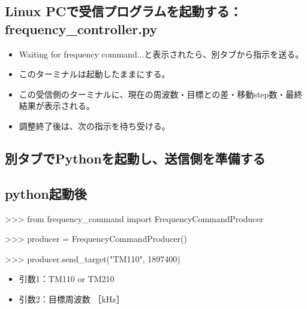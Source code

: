\documentclass[a4paper,11pt]{ltjsarticle}
\begin{document}
\subsection{Linux PCで受信プログラムを起動する：frequency\_controller.py}

\begin{command}


\end{command}

\begin{itemize}

\item Waiting for frequency command...と表示されたら、別タブから指示を送る。

\item このターミナルは起動したままにする。

\item この受信側のターミナルに、現在の周波数・目標との差・移動step数・最終結果が表示される。

\item 調整終了後は、次の指示を待ち受ける。

\end{itemize}

\subsection{別タブでPythonを起動し、送信側を準備する}

\subsection{python起動後}

\begin{command}

>>> from frequency_command import FrequencyCommandProducer

>>> producer = FrequencyCommandProducer()

>>> producer.send_target("TM110", 1897400)

\end{command}

\begin{itemize}

\item 引数1：TM110 or TM210

\item 引数2：目標周波数 ［kHz］

\end{itemize}
\end{document}
